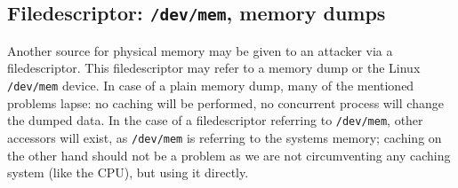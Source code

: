 \subsection{Filedescriptor: \texttt{/dev/mem}, memory dumps}

Another source for physical memory may be given to an attacker via a
filedescriptor. This filedescriptor may refer to a memory dump or the Linux
\texttt{/dev/mem} device. In case of a plain memory dump, many of the mentioned
problems lapse: no caching will be performed, no concurrent process will change
the dumped data. In the case of a filedescriptor referring to \texttt{/dev/mem},
other accessors will exist, as \texttt{/dev/mem} is referring to the systems
memory; caching on the other hand should not be a problem as we are not
circumventing any caching system (like the CPU), but using it directly.



